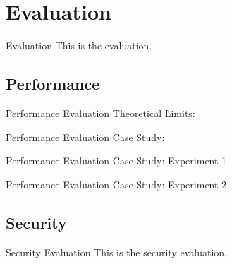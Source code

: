 \section{Evaluation}
\label{sec:evaluation}

\begin{frame}{Evaluation}
  This is the evaluation.
\end{frame}

\subsection{Performance}
\label{subsec:eval-performance}

\begin{frame}{Performance Evaluation}
  Theoretical Limits:
\end{frame}

\begin{frame}{Performance Evaluation}
  Case Study:
\end{frame}

\begin{frame}{Performance Evaluation}
  Case Study: Experiment 1
\end{frame}

\begin{frame}{Performance Evaluation}
  Case Study: Experiment 2
\end{frame}

\subsection{Security}
\label{subsec:eval-security}

\begin{frame}{Security Evaluation}
  This is the security evaluation.
\end{frame}
